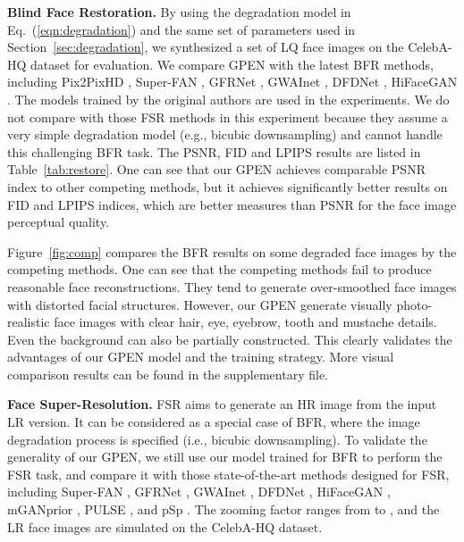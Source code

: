 \documentclass[final]{cvpr}
\begin{document}
\textbf{Blind Face Restoration.}
\label{sec:restoration}
By using the degradation model in Eq.~(\ref{eqn:degradation}) and the same set of parameters used in Section~\ref{sec:degradation}, we synthesized a set of LQ face images on the CelebA-HQ dataset for evaluation. We compare GPEN with the latest BFR methods, including Pix2PixHD \cite{Wang2018Pix2PixHD}, Super-FAN \cite{Bulat2018SuperFAN}, GFRNet \cite{Li2018GFRNet}, GWAInet \cite{Dogan2019Exemplar}, DFDNet \cite{Li2020Restore}, HiFaceGAN \cite{Yang2020HiFaceGANFR}. The models trained by the original authors are used in the experiments. We do not compare with those FSR methods \cite{Gu2019Prior,Menon2020PULSE,Richardson2020pSp} in this experiment because they assume a very simple degradation model (e.g., bicubic downsampling) and cannot handle this challenging BFR task. The PSNR, FID and LPIPS results are listed in Table~\ref{tab:restore}. One can see that our GPEN achieves comparable PSNR index to other competing methods, but it achieves significantly better results on FID and LPIPS indices, which are better measures than PSNR for the face image perceptual quality. 

Figure~\ref{fig:comp} compares the BFR results on some degraded face images by the competing methods. One can see that the competing methods fail to produce reasonable face reconstructions. They tend to generate over-smoothed face images with distorted facial structures. However, our GPEN generate visually photo-realistic face images with clear hair, eye, eyebrow, tooth and mustache details. Even the background can also be partially constructed. This clearly validates the advantages of our GPEN model and the training strategy. More visual comparison results can be found in the supplementary file. 





\textbf{Face Super-Resolution.}
\label{sec:fsr}
FSR aims to generate an HR image from the input LR version. It can be considered as a special case of BFR, where the image degradation process is specified (i.e., bicubic downsampling). To validate the generality of our GPEN, we still use our model trained for BFR to perform the FSR task, and compare it with those state-of-the-art methods designed for FSR, including Super-FAN \cite{Bulat2018SuperFAN}, GFRNet \cite{Li2018GFRNet}, GWAInet \cite{Dogan2019Exemplar}, DFDNet \cite{Li2020Restore}, HiFaceGAN \cite{Yang2020HiFaceGANFR}, mGANprior \cite{Gu2019Prior}, PULSE \cite{Menon2020PULSE}, and pSp \cite{Richardson2020pSp}. The zooming factor ranges from  to , and the LR face images are simulated on the CelebA-HQ dataset.
\end{document}
